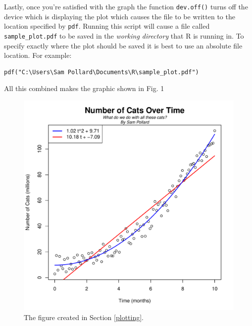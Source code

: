 \documentclass[12pt]{article}
\theoremstyle{remark}
\begin{document}
Lastly, once you're satisfied with the graph the function \verb|dev.off()| turns off the device which is displaying the plot which causes the file to be written to the location specified by \verb|pdf|. Running this script will cause a file called \verb|sample_plot.pdf| to be saved in the \emph{working directory} that R is running in. To specify exactly where the plot should be saved it is best to use an absolute file location. For example:
\begin{verbatim}
pdf("C:\Users\Sam Pollard\Documents\R\sample_plot.pdf")
\end{verbatim}
All this combined makes the graphic shown in Fig. 1 

\begin{figure}[ht]
\label{quadratic}
\centering
\includegraphics[scale=0.6]{sample_plot}
\caption{The figure created in Section \ref{plotting}.}
\end{figure}

\end{document}

